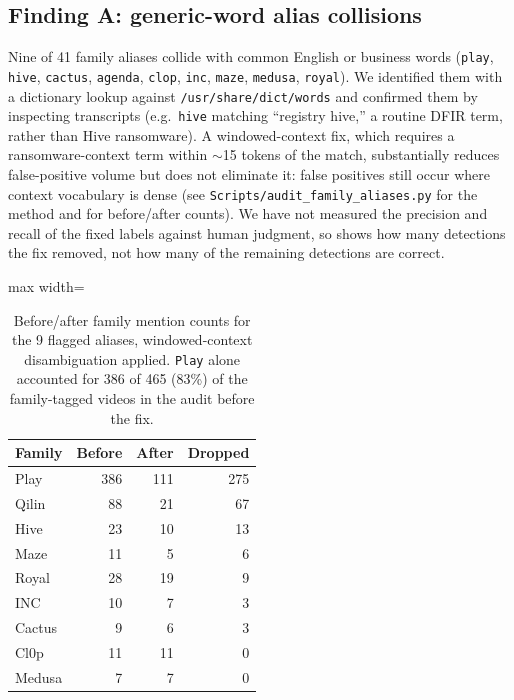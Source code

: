 \documentclass[preprint,12pt]{elsarticle}
\newenvironment{fittable}{\begin{adjustbox}{max width=\textwidth}}{\end{adjustbox}}
\begin{document}
\subsection{Finding A: generic-word alias collisions}
\label{sec:finding-a}
Nine of 41 family aliases collide with common English or business words
(\texttt{play}, \texttt{hive}, \texttt{cactus}, \texttt{agenda},
\texttt{clop}, \texttt{inc}, \texttt{maze}, \texttt{medusa},
\texttt{royal}). We identified them with a dictionary lookup against
\texttt{/usr/share/dict/words} and confirmed them by inspecting transcripts
(e.g.\ \texttt{hive} matching ``registry hive,'' a routine DFIR term, rather
than Hive ransomware). A windowed-context fix, which requires a
ransomware-context term within $\sim$15 tokens of the match, substantially
reduces false-positive volume but does not eliminate it: false positives
still occur where context vocabulary is dense (see
\texttt{Scripts/audit\_family\_aliases.py} for the method and
 for before/after counts). We have not measured the
precision and recall of the fixed labels against human judgment, so
 shows how many detections the fix removed, not how
many of the remaining detections are correct.

\begin{table}[htbp]
\centering
\caption{Before/after family mention counts for the 9 flagged aliases,
  windowed-context disambiguation applied. \texttt{Play} alone accounted
  for 386 of 465 (83\%) of the family-tagged videos in the audit before
  the fix.}
\label{tab:alias-audit}
\begin{fittable}
\begin{tabular}{lrrr}
\toprule
Family & Before & After & Dropped \\
\midrule
Play    & 386 & 111 & 275 \\
Qilin   &  88 &  21 &  67 \\
Hive    &  23 &  10 &  13 \\
Maze    &  11 &   5 &   6 \\
Royal   &  28 &  19 &   9 \\
INC     &  10 &   7 &   3 \\
Cactus  &   9 &   6 &   3 \\
Cl0p    &  11 &  11 &   0 \\
Medusa  &   7 &   7 &   0 \\
\bottomrule
\end{tabular}
\end{fittable}
\end{table}
\end{document}
